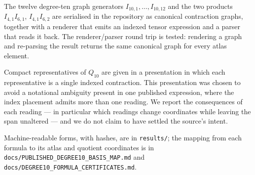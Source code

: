 The twelve degree-ten graph generators $I_{10,1},\dots,I_{10,12}$ and the two
products $I_{4,1}I_{6,1}$, $I_{4,1}I_{6,2}$ are serialised in the repository as
canonical contraction graphs, together with a renderer that emits an indexed
tensor expression and a parser that reads it back. The renderer/parser round trip
is tested: rendering a graph and re-parsing the result returns the same canonical
graph for every atlas element.

Compact representatives of $Q_{10}$ are given in a presentation in which each
representative is a single indexed contraction. This presentation was chosen to
avoid a notational ambiguity present in one published expression, where the index
placement admits more than one reading. We report the consequences of each
reading --- in particular which readings change coordinates while leaving the
span unaltered --- and we do not claim to have settled the source's intent.

Machine-readable forms, with hashes, are in \texttt{results/}; the mapping from
each formula to its atlas and quotient coordinates is in
\texttt{docs/PUBLISHED\_DEGREE10\_BASIS\_MAP.md} and
\texttt{docs/DEGREE10\_FORMULA\_CERTIFICATES.md}.
